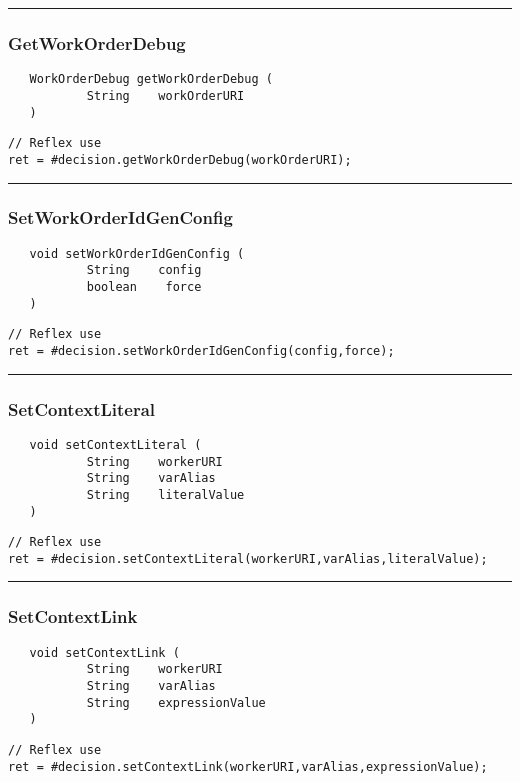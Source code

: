 \rule{15cm}{2pt}
\subsubsection{GetWorkOrderDebug}
\label{Api:GetWorkOrderDebug}
\begin{verbatim}
   WorkOrderDebug getWorkOrderDebug (
           String    workOrderURI
   )
\end{verbatim}
\begin{lstlisting}[language=reflex]
// Reflex use
ret = #decision.getWorkOrderDebug(workOrderURI);
\end{lstlisting}



\rule{15cm}{2pt}
\subsubsection{SetWorkOrderIdGenConfig}
\label{Api:SetWorkOrderIdGenConfig}
\begin{verbatim}
   void setWorkOrderIdGenConfig (
           String    config
           boolean    force
   )
\end{verbatim}
\begin{lstlisting}[language=reflex]
// Reflex use
ret = #decision.setWorkOrderIdGenConfig(config,force);
\end{lstlisting}



\rule{15cm}{2pt}
\subsubsection{SetContextLiteral}
\label{Api:SetContextLiteral}
\begin{verbatim}
   void setContextLiteral (
           String    workerURI
           String    varAlias
           String    literalValue
   )
\end{verbatim}
\begin{lstlisting}[language=reflex]
// Reflex use
ret = #decision.setContextLiteral(workerURI,varAlias,literalValue);
\end{lstlisting}



\rule{15cm}{2pt}
\subsubsection{SetContextLink}
\label{Api:SetContextLink}
\begin{verbatim}
   void setContextLink (
           String    workerURI
           String    varAlias
           String    expressionValue
   )
\end{verbatim}
\begin{lstlisting}[language=reflex]
// Reflex use
ret = #decision.setContextLink(workerURI,varAlias,expressionValue);
\end{lstlisting}



